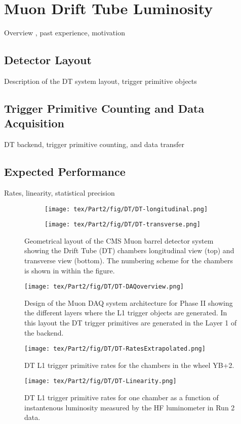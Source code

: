 \chapter{Muon Drift Tube Luminosity}

Overview , past experience, motivation

\section{Detector Layout}
Description of the DT system layout, trigger primitive objects

\section{Trigger Primitive Counting and Data Acquisition}
DT backend, trigger primitive counting, and  data transfer

\section{Expected Performance}
Rates, linearity, statistical precision

\clearpage
\newpage
\begin{figure}[hbtp]
\centering
\begin{subfigure}
  \centering
  \texttt{[image: tex/Part2/fig/DT/DT-longitudinal.png]}
\end{subfigure}
\begin{subfigure}
  \centering
  \texttt{[image: tex/Part2/fig/DT/DT-transverse.png]}
\end{subfigure}
\caption{Geometrical layout of the CMS Muon barrel detector system showing the Drift Tube (DT) chambers longitudinal view (top) and transverse view (bottom). The numbering scheme for the chambers is shown in within the figure.}
\label{fig:DT_layout}
\end{figure}


\begin{figure}[hbtp]
\centering
\texttt{[image: tex/Part2/fig/DT/DT-DAQoverview.png]}
\caption{Design  of the Muon DAQ system architecture for Phase II showing the different layers where the L1 trigger objects are generated. In  this layout the DT trigger primitives are generated in the Layer 1 of the backend.}   
\label{fig:DT_DAQ}
\end{figure}


\begin{figure}[hbtp]
\centering
\texttt{[image: tex/Part2/fig/DT/DT-RatesExtrapolated.png]}
\caption{DT L1 trigger primitive rates for the chambers in the wheel YB+2.} 
\label{fig:DT_rates}
\end{figure}


\begin{figure}[hbtp]
\centering
\texttt{[image: tex/Part2/fig/DT/DT-Linearity.png]}
\caption{DT L1 trigger primitive rates for one chamber  as a function of instantenous luminosity measured by the HF luminometer in Run 2 data.} 
\label{fig:DT_linearity}
\end{figure}
